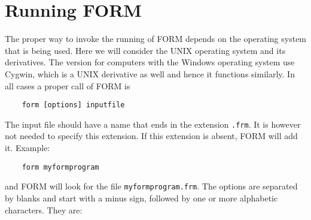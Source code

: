 \chapter{Running FORM}
\label{running}

The proper way to invoke the running of FORM depends on 
the operating system that is being used. Here we will consider the 
UNIX operating system and its derivatives. The version for 
computers with the Windows operating system use Cygwin, which 
is a UNIX derivative as well and hence it functions similarly. In all cases 
a proper call of FORM is
\begin{verbatim}
	form [options] inputfile
\end{verbatim}
The input file should have a name that ends in the 
extension \verb:.frm:. It is however not needed to specify this extension. 
If this extension is absent, FORM will add it. Example:
\begin{verbatim}
	form myformprogram
\end{verbatim}
and FORM will look for the file \verb:myformprogram.frm:. The options are 
separated by blanks and start with a minus sign, followed by one or more 
alphabetic characters. They are:
